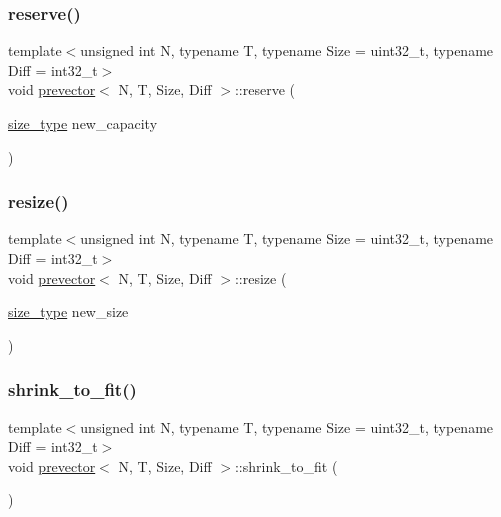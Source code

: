 \mbox{\label{classprevector_ab9a34e0210debc65efda453dbd0cbd27}} 
\subsubsection{\texorpdfstring{reserve()}{reserve()}}
{\footnotesize\ttfamily template$<$unsigned int N, typename T, typename Size = uint32\+\_\+t, typename Diff = int32\+\_\+t$>$ \\
void \mbox{\hyperlink{classprevector}{prevector}}$<$ N, T, Size, Diff $>$\+::reserve (\begin{DoxyParamCaption}\item[{\mbox{\hyperlink{classprevector_a7e0da95e6d1c878f6eeb572f4fc12524}{size\+\_\+type}}}]{new\+\_\+capacity }\end{DoxyParamCaption})\hspace{0.3cm}{\ttfamily [inline]}}

\mbox{\label{classprevector_ad2d97a45e0d2872260e868a540d31860}} 
\subsubsection{\texorpdfstring{resize()}{resize()}}
{\footnotesize\ttfamily template$<$unsigned int N, typename T, typename Size = uint32\+\_\+t, typename Diff = int32\+\_\+t$>$ \\
void \mbox{\hyperlink{classprevector}{prevector}}$<$ N, T, Size, Diff $>$\+::resize (\begin{DoxyParamCaption}\item[{\mbox{\hyperlink{classprevector_a7e0da95e6d1c878f6eeb572f4fc12524}{size\+\_\+type}}}]{new\+\_\+size }\end{DoxyParamCaption})\hspace{0.3cm}{\ttfamily [inline]}}

\mbox{\label{classprevector_a3b82afa760e2aabd8373994a1316523e}} 
\subsubsection{\texorpdfstring{shrink\+\_\+to\+\_\+fit()}{shrink\_to\_fit()}}
{\footnotesize\ttfamily template$<$unsigned int N, typename T, typename Size = uint32\+\_\+t, typename Diff = int32\+\_\+t$>$ \\
void \mbox{\hyperlink{classprevector}{prevector}}$<$ N, T, Size, Diff $>$\+::shrink\+\_\+to\+\_\+fit (\begin{DoxyParamCaption}{ }\end{DoxyParamCaption})\hspace{0.3cm}{\ttfamily [inline]}}


